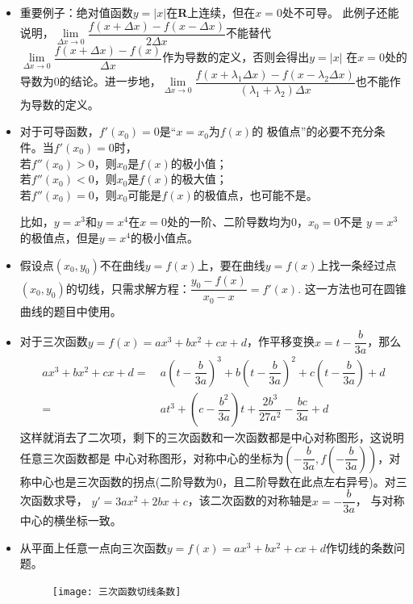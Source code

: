 \begin{itemize}[leftmargin=\inteval{\myitemleftmargin}pt,itemsep=
   \inteval{\myitemitempsep}pt,topsep=\inteval{\myitemtopsep}pt]
\item 重要例子：绝对值函数$ y=|x| $在\textbf{R}上连续，但在$ x=0 $处不可导。
此例子还能说明，$ \lim\limits_{\Delta x\to 0}\dfrac{f(x+\Delta x)-
f(x-\Delta x)}{2\Delta x} $不能替代$ \lim\limits_{\Delta x\to 0}
\dfrac{f(x+\Delta x)-f(x)}{\Delta x} $作为导数的定义，否则会得出$ y=|x| $
在$ x=0 $处的导数为0的结论。进一步地，$ \lim\limits_{\Delta x\to 0}
\dfrac{f(x+\lambda_1\Delta x)-f(x-\lambda_2\Delta x)}{(\lambda_1+
    \lambda_2)\Delta x} $也不能作为导数的定义。

\item 对于可导函数，$ f'(x_0)=0 $是“$ x=x_0 $为$ f(x) $的
极值点”的必要不充分条件。当$ f'(x_0)=0 $时，\\
 若$ f''(x_0)>0 $，则$ x_0 $是$ f(x) $的极小值；\\
 若$ f''(x_0)<0 $，则$ x_0 $是$ f(x) $的极大值；\\
 若$ f''(x_0)=0 $，则$ x_0 $可能是$ f(x) $的极值点，也可能不是。

比如，$ y=x^3 $和$ y=x^4 $在$ x=0 $处的一阶、二阶导数均为0，$ x_0=0 $不是
$ y=x^3 $的极值点，但是$ y=x^4 $的极小值点。

\item  假设点$ (x_0,y_0) $不在曲线$ y=f(x) $上，要在曲线$ y=f(x) $上找一条经过点$ (x_0,y_0) $的切线，只需求解方程：$ \dfrac{y_0-f(x)}{x_0-x}=f'(x) $. 这一方法也可在圆锥曲线的题目中使用。

\item 对于三次函数$ y=f(x)=ax^3+bx^2+cx+d $，作平移变换$ x=t-\dfrac{b}{3a} $，那么
\begin{align*}
    ax^3+bx^2+cx+d=&\ a\left(t-\dfrac{b}{3a}\right)^3+b\left(t-\dfrac{b}{3a}
    \right)^2+c\left(t-\dfrac{b}{3a}\right)+d\\=&\ at^3+\left(c-\dfrac{b^2}{3a}
    \right)t+\dfrac{2b^3}{27a^2}-\dfrac{bc}{3a}+d
\end{align*}
这样就消去了二次项，剩下的三次函数和一次函数都是中心对称图形，这说明任意三次函数都是
中心对称图形，对称中心的坐标为$ \left(-\dfrac{b}{3a},f\left(-\dfrac{b}{3a}\right)\right) $，对称中心也是三次函数的拐点(二阶导数为0，且二阶导数在此点左右异号)。对三次函数求导，
$ y'=3ax^2+2bx+c $，该二次函数的对称轴是$ x=-\dfrac{b}{3a} $，
与对称中心的横坐标一致。

\item 从平面上任意一点向三次函数$ y=f(x)=ax^3+bx^2+cx+d $作切线的条数问题。
\begin{figure}[H]
    \centering
    \texttt{[image: 三次函数切线条数]}
\end{figure}


\end{itemize}
